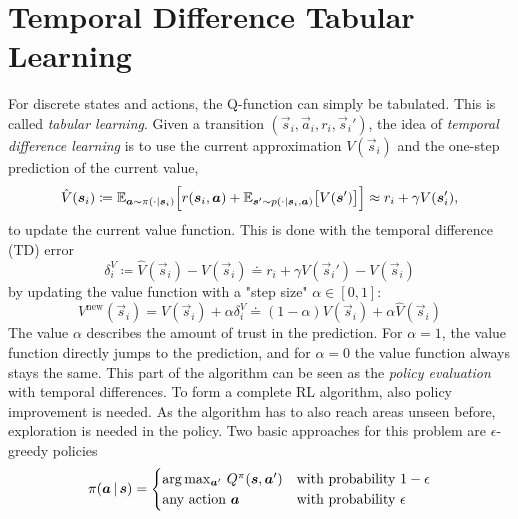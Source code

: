 	\section{Temporal Difference Tabular Learning}
		For discrete states and actions, the Q-function can simply be tabulated. This is called \emph{tabular learning}. Given a transition \( (\vec{s}_i, \vec{a}_i, r_i, \vec{s}_i') \), the idea of \emph{temporal difference learning} is to use the current approximation \( V(\vec{s}_i) \) and the one-step prediction of the current value,
		\begin{equation*}
			\hat{V}(\bm{s}_i) \coloneqq \mathbb{E}_{\bm{a} \sim \pi(\cdot \vert \bm{s}_i)} \Big[ r(\bm{s}_i, \bm{a}) + \mathbb{E}_{\bm{s}' \sim p(\cdot \vert \bm{s}_i, \bm{a})}\big[ V(\bm{s}') \big] \Big] \approx r_i + \gamma V(\bm{s}_i'),
		\end{equation*}
		to update the current value function. This is done with the temporal difference (TD) error
		\begin{equation}
			\delta_i^V \coloneqq \hat{V}(\vec{s}_i) - V(\vec{s}_i) \doteq r_i + \gamma V(\vec{s}_i') - V(\vec{s}_i)  \label{eq:tdVError}
		\end{equation}
		by updating the value function with a "step size" \( \alpha \in [0, 1] \):
		\begin{equation}
			V^\mathrm{new}(\vec{s}_i) = V(\vec{s}_i) + \alpha \delta_i^V \doteq (1 - \alpha) V(\vec{s}_i) + \alpha \hat{V}(\vec{s}_i)  \label{eq:tdVFunction}
		\end{equation}
		The value \(\alpha\) describes the amount of trust in the prediction. For \(\alpha = 1\), the value function directly jumps to the prediction, and for \(\alpha = 0\) the value function always stays the same. This part of the algorithm can be seen as the \emph{policy evaluation} with temporal differences. To form a complete RL algorithm, also policy improvement is needed. As the algorithm has to also reach areas unseen before, exploration is needed in the policy. Two basic approaches for this problem are \(\epsilon\)-greedy policies
		\begin{equation*}
			\pi(\bm{a} \,\vert\, \bm{s}) =
				\begin{cases}
					\arg\max_{\bm{a}'} \, Q^\pi(\bm{s}, \bm{a}') & \text{with probability } 1 - \epsilon \\
					\text{any action } \bm{a}                      & \text{with probability } \epsilon
				\end{cases}
		\end{equation*}
